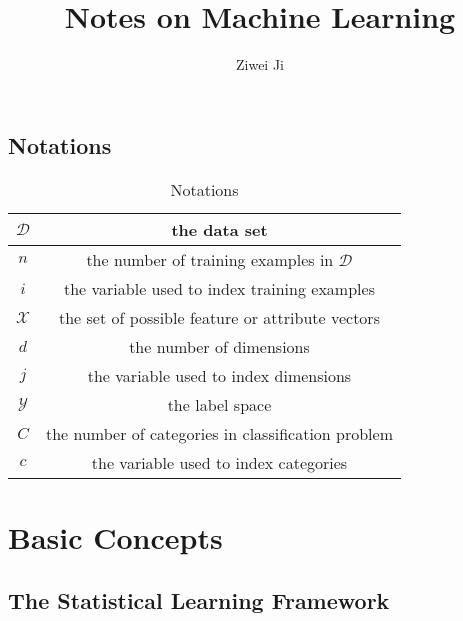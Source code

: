 \documentclass[openany]{book}
\author{Ziwei Ji}
\title{Notes on Machine Learning}
\theoremstyle{definition}
\theoremstyle{remark}
\begin{document}
\maketitle

\tableofcontents

\chapter*{Notations}
\begin{table}[h]
    \centering
\begin{tabular}{|c|c|}
\hline
$\mathcal{D}$ & the data set \\
\hline
$n$ & the number of training examples in $\mathcal{D}$ \\
\hline
$i$ & the variable used to index training examples \\
\hline
$\mathcal{X}$ & the set of possible feature or attribute vectors \\
\hline
$d$ & the number of dimensions \\
\hline
$j$ & the variable used to index dimensions \\
\hline
$\mathcal{Y}$ & the label space \\
\hline
$C$ & the number of categories in classification problem \\
\hline
$c$ & the variable used to index categories \\
\hline
\end{tabular}
\caption{Notations}
\end{table}

\part{Basic Concepts}
\chapter{The Statistical Learning Framework}
\end{document}
